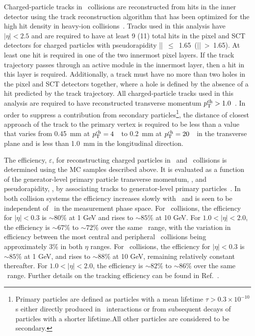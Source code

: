 Charged-particle tracks in \pbpb\ collisions are reconstructed from hits in the inner detector using the track reconstruction algorithm that has been optimized for the high hit density in heavy-ion collisions~\cite{Aaboud:2017all}.
Tracks used in this analysis have $|\eta| < 2.5$ and are required to have at least 9 (11) total hits in the pixel and SCT detectors for charged particles with pseudorapidity \mbox{|\etatrk| $\leq$ 1.65 (|\etatrk| > 1.65)}.
At least one hit is required in one of the two innermost pixel layers.
If the track trajectory passes through an active module in the innermost layer, then a hit in this layer is required.
Additionally, a track must have no more than two holes in the pixel and SCT detectors together, where a hole is defined by the absence of a hit predicted by the track trajectory.
All charged-particle tracks used in this analysis are required to have reconstructed transverse momentum $\mbox{$p_{\mathrm{T}}^{\mathrm{ch}}$} > 1.0 $~\GeV.
In order to suppress a contribution from secondary particles\footnote{Primary particles are defined as particles with a mean lifetime $\tau>0.3\times 10^{-10}$ s either directly produced in \pp\ interactions or from subsequent decays of particles with a shorter lifetime.All other particles are considered to be secondary.}, the distance of closest approach of the track to the primary vertex is required to be less than a value that varies from 0.45~mm at $\mbox{$p_{\mathrm{T}}^{\mathrm{ch}}$}=4$~\GeV\ to 0.2~mm at $\mbox{$p_{\mathrm{T}}^{\mathrm{ch}}$}=20$~\GeV\ in the transverse plane and is less than 1.0~mm in the longitudinal direction.


The efficiency, $\varepsilon$, for reconstructing charged particles in \PbPb\ and \pp\ collisions is determined using the MC samples described above.
It is evaluated as a function of the generator-level primary particle transverse momentum, \pTtrue, and pseudorapidity, \etatrue, by associating tracks to generator-level primary particles~\cite{Aad:2010ah}.
In both collision systems the efficiency increases slowly with \pTtrue\ and is seen to be independent of \ptjet\ in the measurement phase space.
For \pbpb\ collisions, the efficiency for $|\eta| < 0.3$  is $\sim 80\%$ at 1 GeV and rises to $\sim 85\%$ at 10 GeV.
For $1.0 < |\eta| < 2.0$, the efficiency is $\sim 67\%$ to $\sim 72\%$  over the same \pt\ range, with the variation in efficiency between the most central and peripheral \pbpb\ collisions being approximately 3\% in both $\eta$ ranges.
For \pp\ collisions, the efficiency for $|\eta| < 0.3$ is $\sim85\%$ at 1 GeV, and rises to $\sim 88 \%$ at 10 GeV, remaining relatively constant thereafter.
For $1.0 < |\eta| < 2.0$, the efficiency is $\sim 82\%$ to $\sim 86\%$ over the same \pt\ range.
Further details on the tracking efficiency can be found in \mbox{Ref.~\cite{Aaboud:2017bzv}}.

